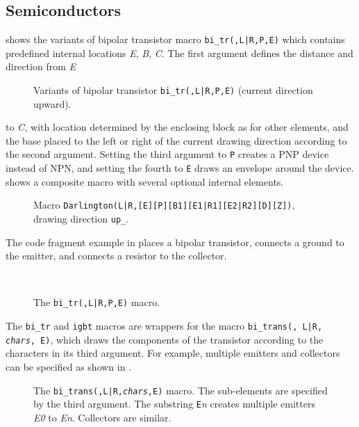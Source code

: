 \subsection{Semiconductors\label{Semiconductors:}}%
 shows the variants of bipolar transistor macro
{\tt bi\_tr(\linespec,L|R,P,E)}
which contains predefined internal locations {\sl E},
{\sl B}, {\sl C}.
The first argument defines the distance and direction from {\sl E}
\begin{figure}[h!t]
   
   \caption{Variants of bipolar transistor {\tt bi\_tr(\linespec,L|R,P,E)}
    (current direction upward).}
   \label{Bip}
   \end{figure}
to {\sl C,} with location determined by the enclosing
block as for other elements, and the base placed
to the left or right of the
current drawing direction according to the second argument.  Setting the third
argument to {\tt P} creates a PNP device instead of NPN, and setting the
fourth to {\tt E} draws an envelope around the device.
 shows a composite macro with several optional internal elements.
\begin{figure}[h!t]
   
   \caption{Macro {\tt Darlington(L|R,[E][P][B1][E1|R1][E2|R2][D][Z])},
     drawing direction {\tt up\_}.}
   \label{Darlington}
   \end{figure}

The code fragment example in  places a bipolar transistor,
connects a ground to the emitter, and connects a resistor to the collector.
\begin{figure}[h!t]
\vspace*{-\baselineskip}
   \quad\quad\parbox{4in}{\small }%
   \quad\raise-0.4in\hbox{ }%
   \vspace{-\baselineskip}
   \caption{The {\tt bi\_tr(\linespec,L|R,P,E)} macro.}
   \label{bitr}
   \end{figure}

The {\tt bi\_tr} and {\tt igbt} macros are wrappers for
the macro {\tt bi\_trans(\linespec, L|R, {\sl chars}, E)}, which
draws the components of the transistor according to the characters in its
third argument.  For example, multiple emitters and collectors can be
specified as shown in .
\begin{figure}[h!t]
\vspace*{-0.5\baselineskip}
   
   \caption{The {\tt bi\_trans(\linespec,L|R,{\sl chars},E)} macro.
   The sub-elements are specified by the third argument.  The substring
   {\tt E}{\sl n} creates multiple emitters {\sl E0} to {\sl En}.
   Collectors are similar.}
   \label{bitrans}
   \end{figure}

